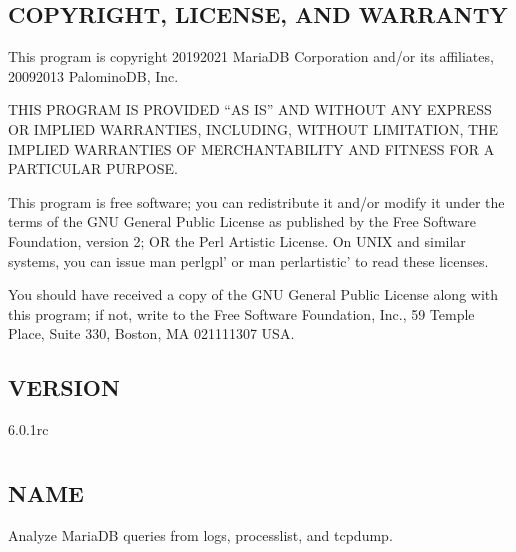 \documentclass[letterpaper,10pt,english]{sphinxmanual}
\begin{document}
\section{COPYRIGHT, LICENSE, AND WARRANTY}
\label{\detokenize{mariadb-parted:copyright-license-and-warranty}}
\sphinxAtStartPar
This program is copyright 2019\sphinxhyphen{}2021 MariaDB Corporation and/or its affiliates,
2009\sphinxhyphen{}2013 PalominoDB, Inc.

\sphinxAtStartPar
THIS PROGRAM IS PROVIDED “AS IS” AND WITHOUT ANY EXPRESS OR IMPLIED
WARRANTIES, INCLUDING, WITHOUT LIMITATION, THE IMPLIED WARRANTIES OF
MERCHANTABILITY AND FITNESS FOR A PARTICULAR PURPOSE.

\sphinxAtStartPar
This program is free software; you can redistribute it and/or modify it under
the terms of the GNU General Public License as published by the Free Software
Foundation, version 2; OR the Perl Artistic License.  On UNIX and similar
systems, you can issue \textasciigrave{}man perlgpl’ or \textasciigrave{}man perlartistic’ to read these
licenses.

\sphinxAtStartPar
You should have received a copy of the GNU General Public License along with
this program; if not, write to the Free Software Foundation, Inc., 59 Temple
Place, Suite 330, Boston, MA  02111\sphinxhyphen{}1307  USA.


\section{VERSION}
\label{\detokenize{mariadb-parted:version}}
\sphinxAtStartPar
{} 6.0.1rc


\chapter{}
\label{\detokenize{mariadb-query-digest:mariadb-query-digest}}\label{\detokenize{mariadb-query-digest::doc}}

\section{NAME}
\label{\detokenize{mariadb-query-digest:name}}
\sphinxAtStartPar
{} \sphinxhyphen{} Analyze MariaDB queries from logs, processlist, and tcpdump.
\end{document}
